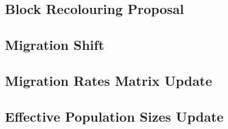 \subsection{Block Recolouring Proposal}
	
	
\subsection{Migration Shift}
	
	
\subsection{Migration Rates Matrix Update}
	
	
\subsection{Effective Population Sizes Update}
	